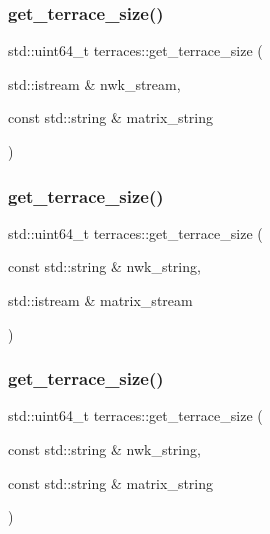 \subsubsection{\texorpdfstring{get\+\_\+terrace\+\_\+size()}{get\_terrace\_size()}\hspace{0.1cm}{\footnotesize\ttfamily [2/4]}}
{\footnotesize\ttfamily std\+::uint64\+\_\+t terraces\+::get\+\_\+terrace\+\_\+size (\begin{DoxyParamCaption}\item[{std\+::istream \&}]{nwk\+\_\+stream,  }\item[{const std\+::string \&}]{matrix\+\_\+string }\end{DoxyParamCaption})}

\mbox{\label{namespaceterraces_a134fb35cc9c3ade97715eaef710ee458}} 
\subsubsection{\texorpdfstring{get\+\_\+terrace\+\_\+size()}{get\_terrace\_size()}\hspace{0.1cm}{\footnotesize\ttfamily [3/4]}}
{\footnotesize\ttfamily std\+::uint64\+\_\+t terraces\+::get\+\_\+terrace\+\_\+size (\begin{DoxyParamCaption}\item[{const std\+::string \&}]{nwk\+\_\+string,  }\item[{std\+::istream \&}]{matrix\+\_\+stream }\end{DoxyParamCaption})}

\mbox{\label{namespaceterraces_a42c8925377cdc643dffb08a08cb76c6b}} 
\subsubsection{\texorpdfstring{get\+\_\+terrace\+\_\+size()}{get\_terrace\_size()}\hspace{0.1cm}{\footnotesize\ttfamily [4/4]}}
{\footnotesize\ttfamily std\+::uint64\+\_\+t terraces\+::get\+\_\+terrace\+\_\+size (\begin{DoxyParamCaption}\item[{const std\+::string \&}]{nwk\+\_\+string,  }\item[{const std\+::string \&}]{matrix\+\_\+string }\end{DoxyParamCaption})}

